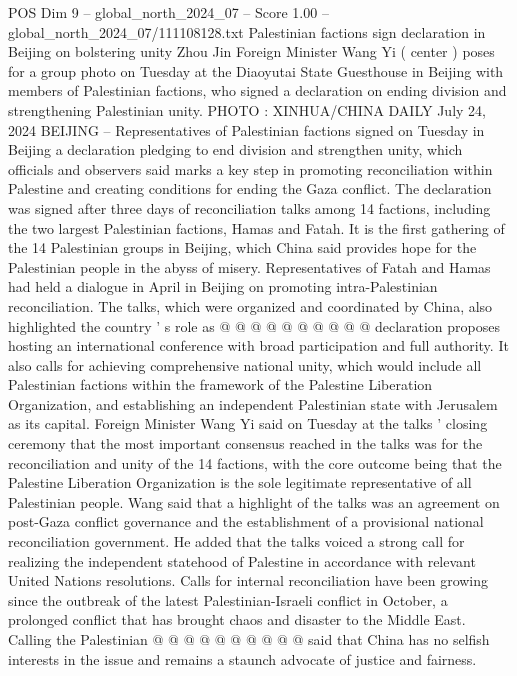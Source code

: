 \begin{textsample}{POS Dim 9 – global\_north\_2024\_07 – Score 1.00 – global\_north\_2024\_07/111108128.txt}  \label{ex:f9_pos_289}
Palestinian factions sign declaration in Beijing on bolstering unity Zhou Jin Foreign Minister Wang Yi ( center ) poses for a group photo on Tuesday at the Diaoyutai State Guesthouse in Beijing with members of Palestinian factions, who signed a declaration on ending division and strengthening Palestinian unity.
PHOTO : XINHUA/CHINA DAILY July 24, 2024 BEIJING -- Representatives of Palestinian factions signed on Tuesday in Beijing a declaration pledging to end division and strengthen unity, which officials and observers said marks a key step in promoting reconciliation within Palestine and creating conditions for ending the Gaza conflict.
The declaration was signed after three days of reconciliation talks among 14 factions, including the two largest Palestinian factions, Hamas and Fatah.
It is the first gathering of the 14 Palestinian groups in Beijing, which China said provides hope for the Palestinian people in the abyss of misery.
Representatives of Fatah and Hamas had held a dialogue in April in Beijing on promoting intra-Palestinian reconciliation.
The talks, which were organized and coordinated by China, also highlighted the country ' s role as @ @ @ @ @ @ @ @ @ @ declaration proposes hosting an international conference with broad participation and full authority.
It also calls for achieving comprehensive national unity, which would include all Palestinian factions within the framework of the Palestine Liberation Organization, and establishing an independent Palestinian state with Jerusalem as its capital.
Foreign Minister Wang Yi said on Tuesday at the talks ' closing ceremony that the most important consensus reached in the talks was for the reconciliation and unity of the 14 factions, with the core outcome being that the Palestine Liberation Organization is the sole legitimate representative of all Palestinian people.
Wang said that a highlight of the talks was an agreement on post-Gaza conflict governance and the establishment of a provisional national reconciliation government.
He added that the talks voiced a strong call for realizing the independent statehood of Palestine in accordance with relevant United Nations resolutions.
Calls for internal reconciliation have been growing since the outbreak of the latest Palestinian-Israeli conflict in October, a prolonged conflict that has brought chaos and disaster to the Middle East.
Calling the Palestinian @ @ @ @ @ @ @ @ @ @ said that China has no selfish interests in the issue and remains a staunch advocate of justice and fairness.

\end{textsample}
